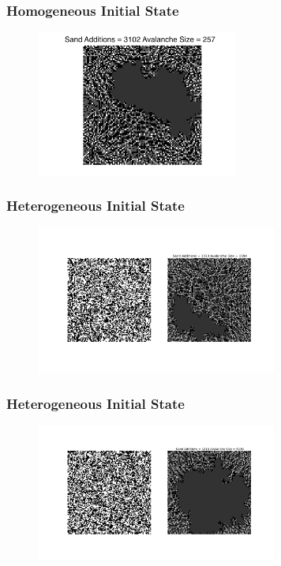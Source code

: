 \documentclass{beamer}
\begin{document}
\frame
{
  \frametitle{Homogeneous Initial State}

   \begin{figure}
   \includegraphics[width = 250]{avalanchehomo}
   \end{figure}

}

\frame
{
  \frametitle{Heterogeneous Initial State}

   \begin{figure}
   \includegraphics[width = 300]{avalanchehetero}
   \end{figure}

}

\frame
{
  \frametitle{Heterogeneous Initial State}

   \begin{figure}
   \includegraphics[width = 300]{bigavalanchehetero}
   \end{figure}

}
\end{document}
